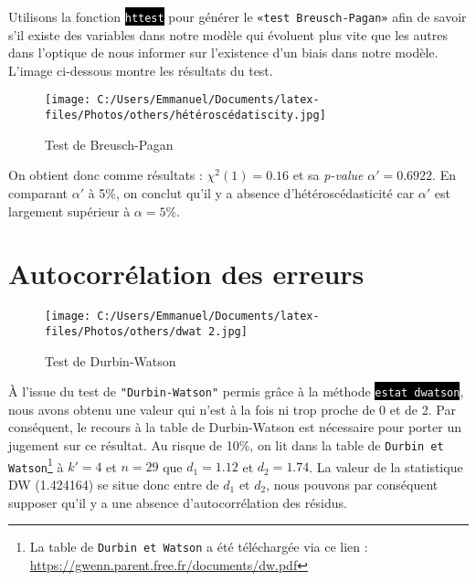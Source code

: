 \documentclass[a4paper, 12pt, openany]{book}
\begin{document}
\hspace*{.8cm}Utilisons la fonction \colorbox{black}{\textcolor{white}{\texttt{httest}}} pour générer le \texttt{«test Breusch‐Pagan»}
afin de savoir s'il existe des variables dans notre modèle qui évoluent plus vite que les autres
dans l'optique de nous informer sur l'existence d'un biais dans notre modèle.
L'image ci-dessous montre les résultats du test.

\begin{figure}[H]
    \centering
    \texttt{[image: C:/Users/Emmanuel/Documents/latex-files/Photos/others/hétéroscédatiscity.jpg]}
    \caption{Test de Breusch-Pagan}
\end{figure}
\noindent On obtient donc comme résultats : $\chi^2(1)=0.16$ et sa \textit{p-value} $\alpha'=0.6922$.
En comparant $\alpha'$ à 5\%, on conclut qu'il y a absence d'hétéroscédasticité car $\alpha'$ est 
largement supérieur à $\alpha = 5\%$.
\linebreak
\section{Autocorrélation des erreurs}
\begin{figure}[H]
    \centering
    \texttt{[image: C:/Users/Emmanuel/Documents/latex-files/Photos/others/dwat~2.jpg]}
    \caption{Test de Durbin-Watson}
\end{figure}

À l'issue du test de \texttt{"Durbin-Watson"} permis grâce à la méthode \colorbox{black}{\textcolor{white}{\texttt{estat dwatson}}}, 
nous avons obtenu une valeur qui n’est à la fois ni trop proche de 0 et de 2.
Par conséquent, le recours à la table de Durbin-Watson est nécessaire pour porter un jugement sur ce résultat.
Au risque de 10\%, on lit dans la table de \texttt{Durbin et Watson}\footnote{La table de \texttt{Durbin et Watson} a été téléchargée via ce lien : \url{https://gwenn.parent.free.fr/documents/dw.pdf}} à $k'=4$ et $n=29$ que $d_1 =1.12$ et
$d_2 = 1.74$. La valeur de la statistique DW (1.424164) se situe donc entre de $d_1$ et $d_2$, 
nous pouvons par conséquent supposer qu'il y a une absence d’autocorrélation des résidus.
\end{document}
